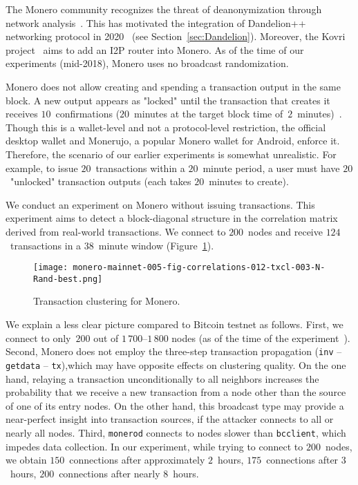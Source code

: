 The Monero community recognizes the threat of deanonymization through network analysis~\cite{user36432017, manontheinside2016, expez2016, Cameron2016}.
This has motivated the integration of Dandelion++ networking protocol in 2020~\cite{ErCiccione2020} (see Section~\ref{sec:Dandelion}).
Moreover, the Kovri project~\cite{Kovri} aims to add an I2P router into Monero.
As of the time of our experiments (mid-2018), Monero uses no broadcast randomization.

Monero does not allow creating and spending a transaction output in the same block.
A new output appears as "locked" until the transaction that creates it receives $10$~confirmations ($20$~minutes at the target block time of~$2$~minutes)~\cite{dpzz2017}.
Though this is a wallet-level and not a protocol-level restriction, the official desktop wallet and Monerujo, a popular Monero wallet for Android, enforce it.
Therefore, the scenario of our earlier experiments is somewhat unrealistic.
For example, to issue $20$~transactions within a $20$~minute period, a user must have $20$~"unlocked" transaction outputs (each takes $20$~minutes to create).

We conduct an experiment on Monero without issuing transactions.
This experiment aims to detect a block-diagonal structure in the correlation matrix derived from real-world transactions.
We connect to $200$~nodes and receive $124$~transactions in a $38$~minute window (Figure~\ref{fig:monero}).

\begin{figure}[!t]
	\centering
	\texttt{[image: monero-mainnet-005-fig-correlations-012-txcl-003-N-Rand-best.png]}
	\caption{Transaction clustering for Monero.}
	\label{fig:monero}
\end{figure}

We explain a less clear picture compared to Bitcoin testnet as follows.
First, we connect to only~$200$ out of $1\,700$--$1\,800$ nodes (as of the time of the experiment~\cite{MoneroHash}).
Second, Monero does not employ the three-step transaction propagation (\texttt{inv} -- \texttt{getdata} -- \texttt{tx}),which may have opposite effects on clustering quality.
On the one hand, relaying a transaction unconditionally to all neighbors increases the probability that we receive a new transaction from a node other than the source of one of its entry nodes.
On the other hand, this broadcast type may provide a near-perfect insight into transaction sources, if the attacker connects to all or nearly all nodes.
Third, \texttt{monerod} connects to nodes slower than \texttt{bcclient}, which impedes data collection.
In our experiment, while trying to connect to $200$~nodes, we obtain $150$~connections after approximately $2$~hours, $175$~connections after $3$~hours, $200$~connections after nearly $8$~hours.

